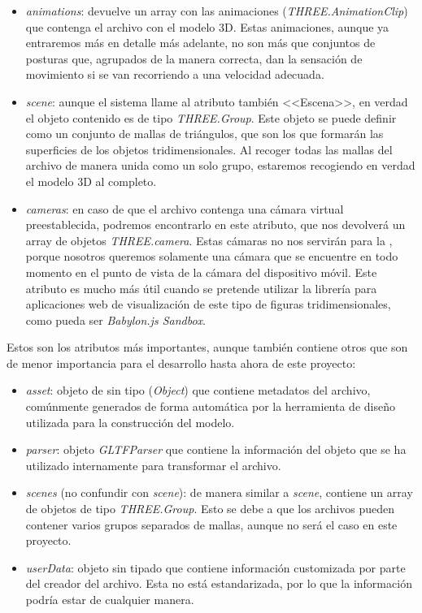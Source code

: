 \documentclass{subfiles}
\begin{document}
        \begin{itemize}
            \item \textit{animations}: devuelve un array con las animaciones (\textit{THREE.AnimationClip}) que contenga el archivo con el modelo 3D. Estas animaciones, aunque ya entraremos más en detalle más adelante, no son más que conjuntos de posturas que, agrupados de la manera correcta, dan la sensación de movimiento si se van recorriendo a una velocidad adecuada.
            \item \textit{scene}: aunque el sistema llame al atributo también <<Escena>>, en verdad el objeto contenido es de tipo \textit{THREE.Group}. Este objeto se puede definir como un conjunto de mallas de triángulos, que son los que formarán las superficies de los objetos tridimensionales. Al recoger todas las mallas del archivo de manera unida como un solo grupo, estaremos recogiendo en verdad el modelo 3D al completo.
            \item \textit{cameras}: en caso de que el archivo contenga una cámara virtual preestablecida, podremos encontrarlo en este atributo, que nos devolverá un array de objetos \textit{THREE.camera}. Estas cámaras no nos servirán para la \ra, porque nosotros queremos solamente una cámara que se encuentre en todo momento en el punto de vista de la cámara del dispositivo móvil. Este atributo es mucho más útil cuando se pretende utilizar la librería para aplicaciones web de visualización de este tipo de figuras tridimensionales, como pueda ser \textit{Babylon.js Sandbox}.
        \end{itemize}

        Estos son los atributos más importantes, aunque también contiene otros que son de menor importancia para el desarrollo hasta ahora de este proyecto: 

        \begin{itemize}
            \item \textit{asset}: objeto de \js sin tipo (\textit{Object}) que contiene metadatos del archivo, comúnmente generados de forma automática por la herramienta de diseño utilizada para la construcción del modelo.
            \item \textit{parser}: objeto \textit{GLTFParser} que contiene la información del objeto que se ha utilizado internamente para transformar el archivo.
            \item \textit{scenes} (no confundir con \textit{scene}): de manera similar a \textit{scene}, contiene un array de objetos de tipo \textit{THREE.Group}. Esto se debe a que los archivos \gltf pueden contener varios grupos separados de mallas, aunque no será el caso en este proyecto.
            \item \textit{userData}: objeto sin tipado que contiene información customizada por parte del creador del archivo. Esta no está estandarizada, por lo que la información podría estar de cualquier manera.
        \end{itemize}
\end{document}
